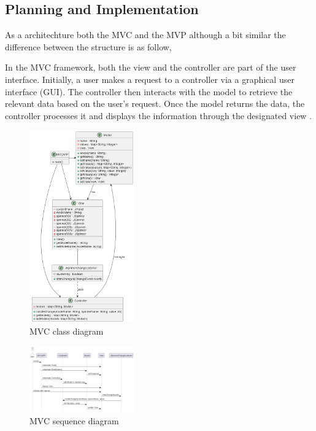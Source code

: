 \documentclass[conference]{IEEEtran}
\begin{document}
\subsection{Planning and Implementation}
As a architechture both the MVC and the MVP although a bit similar the difference between the structure is as follow, 

In the MVC framework, both the view and the controller are part of the user interface. Initially, a user makes a request to a controller via a graphical user interface (GUI). The controller then interacts with the model to retrieve the relevant data based on the user’s request. Once the model returns the data, the controller processes it and displays the information through the designated view \cite{c6}.

\begin{figure}
    [h]
    \centering
    \includegraphics[width = 0.4\textwidth]{Image/mvc_class_diagram.png}
    \caption{MVC class diagram}
    \label{fig:enter-label}
\end{figure}

\begin{figure}
    [h]
    \centering
    \includegraphics[width = 0.4\textwidth]{Image/mvc_sequence_diagram.png}
    \caption{MVC sequence diagram}
    \label{fig:enter-label}
\end{figure}
\end{document}
